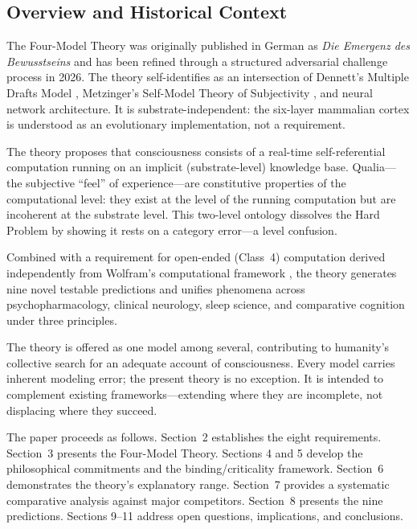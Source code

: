 \documentclass[12pt]{article}
\begin{document}
\subsection{Overview and Historical Context}

The Four-Model Theory was originally published in German as \emph{Die Emergenz des Bewusstseins} \citep{Gruber2015} and has been refined through a structured adversarial challenge process in 2026. The theory self-identifies as an intersection of Dennett's Multiple Drafts Model \citep{Dennett1991}, Metzinger's Self-Model Theory of Subjectivity \citep{Metzinger2003,Metzinger2009}, and neural network architecture. It is substrate-independent: the six-layer mammalian cortex is understood as an evolutionary implementation, not a requirement.

The theory proposes that consciousness consists of a real-time self-referential computation running on an implicit (substrate-level) knowledge base. Qualia---\hspace{0pt}the subjective ``feel'' of experience---\hspace{0pt}are constitutive properties of the computational level: they exist at the level of the running computation but are incoherent at the substrate level. This two-level ontology dissolves the Hard Problem by showing it rests on a category error---\hspace{0pt}a level confusion.

Combined with a requirement for open-ended (Class~4) computation derived independently from Wolfram's computational framework \citep{Wolfram2002}, the theory generates nine novel testable predictions and unifies phenomena across psychopharmacology, clinical neurology, sleep science, and comparative cognition under three principles.

The theory is offered as one model among several, contributing to humanity's collective search for an adequate account of consciousness. Every model carries inherent modeling error; the present theory is no exception. It is intended to complement existing frameworks---\hspace{0pt}extending where they are incomplete, not displacing where they succeed.

The paper proceeds as follows. Section~2 establishes the eight requirements. Section~3 presents the Four-Model Theory. Sections 4 and 5 develop the philosophical commitments and the binding/criticality framework. Section~6 demonstrates the theory's explanatory range. Section~7 provides a systematic comparative analysis against major competitors. Section~8 presents the nine predictions. Sections 9--11 address open questions, implications, and conclusions.
\end{document}
